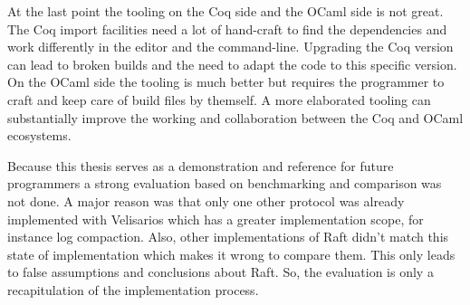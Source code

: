 At the last point the tooling on the Coq side and the OCaml
side is not great. The Coq import facilities need a lot
of hand-craft to find the dependencies and work differently
in the editor and the command-line. Upgrading the Coq
version can lead to broken builds and the need to adapt
the code to this specific version. On the OCaml side
the tooling is much better but requires the programmer
to craft and keep care of build files by themself.
A more elaborated tooling can substantially improve
the working and collaboration between the Coq and OCaml
ecosystems.

Because this thesis serves as a demonstration and
reference for future programmers a strong evaluation
based on benchmarking and comparison was not done.
A major reason was that only one other protocol
was already implemented with Velisarios which
has a greater implementation scope, for instance log compaction.
Also, other implementations of Raft didn't match this
state of implementation which makes it wrong to
compare them. This only leads to false assumptions
and conclusions about Raft. So, the evaluation
is only a recapitulation of the implementation process.


